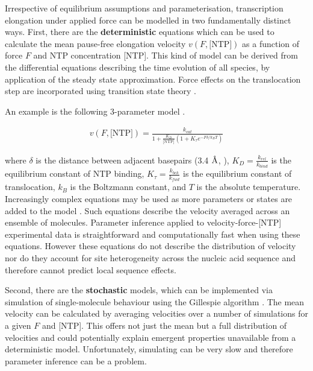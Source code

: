 \documentclass[10pt,letterpaper]{article}
\newcommand{\angstrom}{\mbox{\normalfont\AA}}
\begin{document}
Irrespective of equilibrium assumptions and parameterisation, transcription elongation under applied force can be modelled in two fundamentally distinct ways. First, there are the \textbf{deterministic}  equations which can be used to calculate the mean pause-free elongation velocity $v(F, \text{[NTP]})$ as a function of force $F$ and NTP concentration [NTP].  This kind of model can be derived from  the differential equations describing the time evolution of all species, by application of the steady state approximation. Force effects on the translocation step are incorporated using transition state theory \cite{bustamante2004mechanical,cleland1975partition}.

An example is the following 3-parameter model \cite{abbondanzieri2005direct}.


\begin{eqnarray}
\label{eq:deterministicBoltzmann}
v(F, \text{[NTP]}) = \frac{k_{cat}}{1 + \frac{K_D}{\text{[NTP]}}(1 + K_\tau  e^{-F \delta / k_B T})}
\end{eqnarray}



where $\delta$ is the distance between adjacent basepairs (3.4 $\angstrom$, \cite{watson1953molecular}), $K_D = \frac{k_{rel}}{k_{bind}}$ is the equilibrium constant of NTP binding, $K_\tau = \frac{k_{bck}}{k_{fwd}}$ is the equilibrium constant of translocation, $k_B$ is the Boltzmann constant, and $T$ is the absolute temperature. Increasingly complex equations may be used as more parameters or states are added to the model \cite{abbondanzieri2005direct, maoileidigh2011unified, bai2007mechanochemical}. Such equations describe the velocity averaged across an ensemble of molecules. Parameter inference applied to velocity-force-[NTP] experimental data is straightforward and computationally fast when using these equations. However these equations do not describe the distribution of velocity nor do they account for site heterogeneity across the nucleic acid sequence and therefore cannot predict local sequence effects. \par


Second, there are the \textbf{stochastic} models, which can be implemented via simulation of single-molecule behaviour using the Gillespie algorithm \cite{gillespie1977exact}. The mean velocity can be calculated by averaging velocities over a number of simulations for a given $F$ and [NTP]. This offers not just the mean but a full distribution of velocities and could potentially explain emergent properties unavailable from a deterministic model. Unfortunately, simulating can be very slow and therefore parameter inference can be a problem. \\
\end{document}
